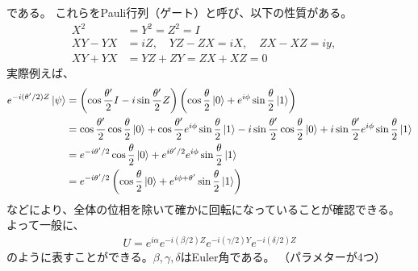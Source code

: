 \documentclass[]{ltjsarticle}
\begin{document}
である。
これらをPauli行列（ゲート）と呼び、以下の性質がある。
\begin{align}
    X^2 &= Y^2 = Z^2 = I \\
    XY - YX &= iZ, \quad 
    YZ - ZX = iX, \quad 
    ZX - XZ = iy, \quad \\
    XY + YX &= YZ + ZY = ZX + XZ = 0
\end{align}
実際例えば、
\begin{align}
    e^{-i(\theta'/2)Z}\ket{\psi} 
    &=
    \left(
        \cos\frac{\theta'}{2}I - i\sin\frac{\theta'}{2}Z
    \right)
    \left(
        \cos\frac{\theta}{2} \ket{0} + e^{i\phi}\sin\frac{\theta}{2}\ket{1}
    \right) \\
    &=
    \cos\frac{\theta'}{2} \cos\frac{\theta}{2} \ket{0} 
    + 
    \cos\frac{\theta'}{2} e^{i\phi}\sin\frac{\theta}{2}\ket{1}
    -
    i\sin\frac{\theta'}{2} \cos\frac{\theta}{2}\ket{0} 
    + 
    i\sin\frac{\theta'}{2} e^{i\phi}\sin\frac{\theta}{2} \ket{1} \\
    &=
    e^{-i\theta'/2}\cos\frac{\theta}{2}\ket{0}
    +
    e^{i\theta'/2}e^{i\phi}\sin\frac{\theta}{2}\ket{1} \\
    &=
    e^{-i\theta'/2}
    \left(
        \cos\frac{\theta}{2}\ket{0}
        +
        e^{i\phi+\theta'}\sin\frac{\theta}{2}\ket{1}
    \right)
\end{align}
などにより、全体の位相を除いて確かに回転になっていることが確認できる。
よって一般に、
\begin{align}
    U = e^{i\alpha} e^{-i(\beta/2)Z} e^{-i(\gamma/2)Y} e^{-i(\delta/2)Z}
\end{align}
のように表すことができる。$\beta, \gamma, \delta$はEuler角である。
（パラメターが4つ）
\end{document}
